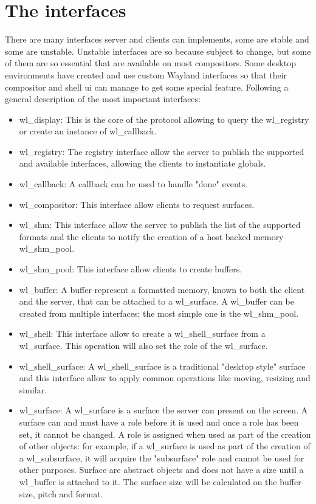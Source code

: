 \section{The interfaces}
There are many interfaces server and clients can implements, some are stable and some are unstable. Unstable interfaces are so because subject to change, but some of them are so essential that are available on most compositors. Some desktop environments have created and use custom Wayland interfaces so that their compositor and shell ui can manage to get some special feature. Following a general description of the most important interfaces:
\begin{itemize}
	\item wl\_display: This is the core of the protocol allowing to query the wl\_registry or create an instance of wl\_callback.
	\item wl\_registry: The registry interface allow the server to publish the supported and available interfaces, allowing the clients to instantiate globals.
	\item wl\_callback: A callback can be used to handle "done" events.
	\item wl\_compositor: This interface allow clients to request surfaces. 
	\item wl\_shm: This interface allow the server to publish the list of the supported formats and the clients to notify the creation of a host backed memory wl\_shm\_pool.
	\item wl\_shm\_pool: This interface allow clients to create buffers.
	\item wl\_buffer: A buffer represent a formatted memory, known to both the client and the server, that can be attached to a wl\_surface. A wl\_buffer can be created from multiple interfaces; the most simple one is the wl\_shm\_pool.
	\item wl\_shell: This interface allow to create a wl\_shell\_surface from a wl\_surface. This operation will also set the role of the wl\_surface.
	\item wl\_shell\_surface: A wl\_shell\_surface is a traditional "desktop style" surface and this interface allow to apply common operations like moving, resizing and similar.
	\item wl\_surface: A wl\_surface is a surface the server can present on the screen. A surface can and must have a role before it is used and once a role has been set, it cannot be changed. A role is assigned when used as part of the creation of other objects: for example, if a wl\_surface is used as part of the creation of a wl\_subsurface, it will acquire the "subsurface" role and cannot be used for other purposes. Surface are abstract objects and does not have a size until a wl\_buffer is attached to it. The surface size will be calculated on the buffer size, pitch and format.

\end{itemize}
